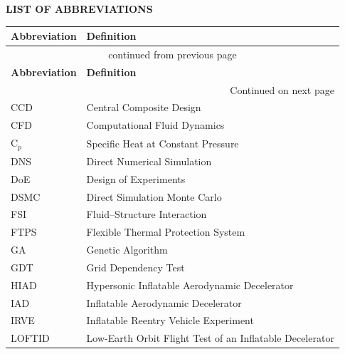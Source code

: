 \clearpage
{}
{}
\begin{center}
{\bfseries \Large LIST OF ABBREVIATIONS}
\end{center}
\vspace{1em}

\begingroup
\setlength{\LTleft}{0.5cm}
\setlength{\LTright}{0.5cm}
\renewcommand{\arraystretch}{1.05}
\begin{longtable}{|p{4.0cm}|p{8.2cm}|}
\hline
    \textbf{Abbreviation} & \textbf{Definition}            \\
\hline
\endfirsthead
\multicolumn{2}{|c|}{continued from previous page} \\
\hline
    \textbf{Abbreviation} & \textbf{Definition}            \\
\hline
\endhead
\hline \multicolumn{2}{|r|}{{Continued on next page}} \\ \hline
\endfoot
\hline
\endlastfoot
    CCD         & Central Composite Design              \\
    CFD         & Computational Fluid Dynamics          \\
    C$_p$       & Specific Heat at Constant Pressure     \\
    DNS         & Direct Numerical Simulation            \\
    DoE         & Design of Experiments                  \\
    DSMC        & Direct Simulation Monte Carlo          \\
    FSI         & Fluid--Structure Interaction            \\
    FTPS        & Flexible Thermal Protection System     \\
    GA          & Genetic Algorithm                      \\
    GDT         & Grid Dependency Test                   \\
    HIAD        & Hypersonic Inflatable Aerodynamic Decelerator \\
    IAD         & Inflatable Aerodynamic Decelerator     \\
    IRVE        & Inflatable Reentry Vehicle Experiment  \\
    LOFTID      & Low-Earth Orbit Flight Test of an Inflatable Decelerator \\

\end{longtable}
